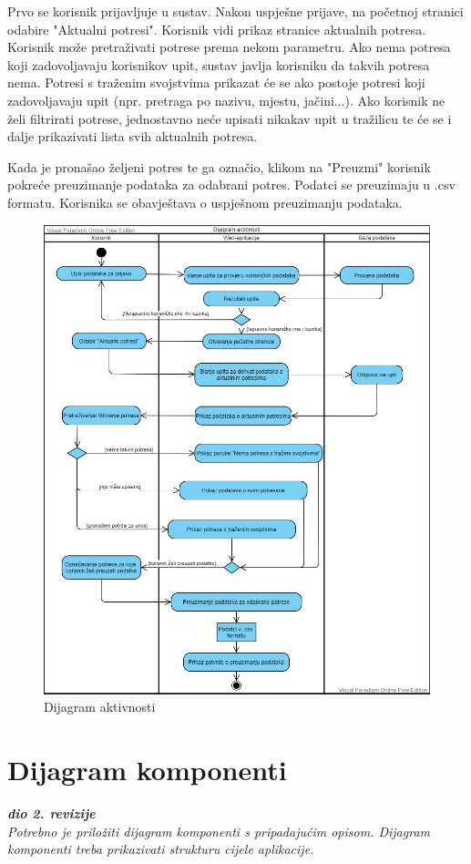 		Prvo se korisnik prijavljuje u sustav. Nakon uspješne prijave, na početnoj stranici odabire "Aktualni potresi". Korisnik vidi prikaz stranice aktualnih potresa. Korisnik može pretraživati potrese prema nekom parametru. Ako nema potresa koji zadovoljavaju korisnikov upit, sustav javlja korisniku da takvih potresa nema. Potresi s traženim svojstvima prikazat će se ako postoje potresi koji zadovoljavaju upit (npr. pretraga po nazivu, mjestu, jačini...). Ako korisnik ne želi filtrirati potrese, jednostavno neće upisati nikakav upit u tražilicu te će se i dalje prikazivati lista svih aktualnih potresa.
		
		Kada je pronašao željeni potres te ga označio, klikom na "Preuzmi" korisnik pokreće preuzimanje podataka za odabrani potres. Podatci se preuzimaju u .csv formatu. Korisnika se obavještava o uspješnom preuzimanju podataka.
		
		\begin{figure}[H]
			\includegraphics[width=\textwidth]{slike/dijagram_aktivnosti.png}
			\caption{Dijagram aktivnosti}
			\label{fig:uml_db} 
		\end{figure}
		
			
			\eject
		\section{Dijagram komponenti}
		
			\textbf{\textit{dio 2. revizije}}\\
		
			 \textit{Potrebno je priložiti dijagram komponenti s pripadajućim opisom. Dijagram komponenti treba prikazivati strukturu cijele aplikacije.}
		\eject